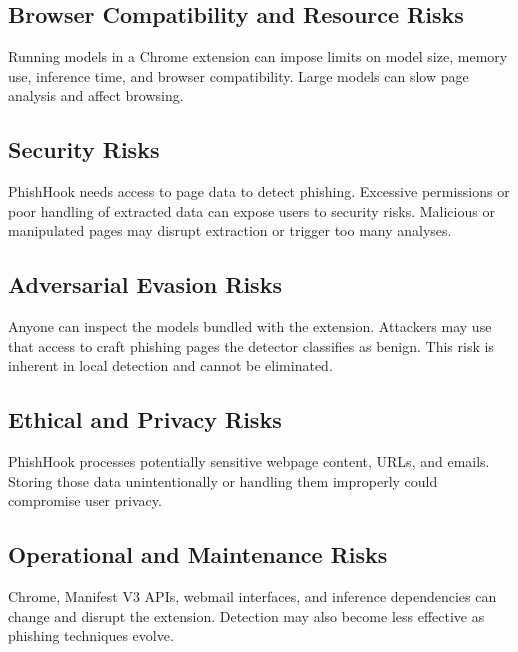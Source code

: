 \documentclass{FastFyp}
\begin{document}
\subsection{Browser Compatibility and Resource Risks}
Running models in a Chrome extension can impose limits on model size, memory use, inference time, and browser compatibility. Large models can slow page analysis and affect browsing.

\subsection{Security Risks}
PhishHook needs access to page data to detect phishing. Excessive permissions or poor handling of extracted data can expose users to security risks. Malicious or manipulated pages may disrupt extraction or trigger too many analyses.

\subsection{Adversarial Evasion Risks}
Anyone can inspect the models bundled with the extension. Attackers may use that access to craft phishing pages the detector classifies as benign. This risk is inherent in local detection and cannot be eliminated.

\subsection{Ethical and Privacy Risks}
PhishHook processes potentially sensitive webpage content, URLs, and emails. Storing those data unintentionally or handling them improperly could compromise user privacy.

\subsection{Operational and Maintenance Risks}
Chrome, Manifest V3 APIs, webmail interfaces, and inference dependencies can change and disrupt the extension. Detection may also become less effective as phishing techniques evolve.
\end{document}
